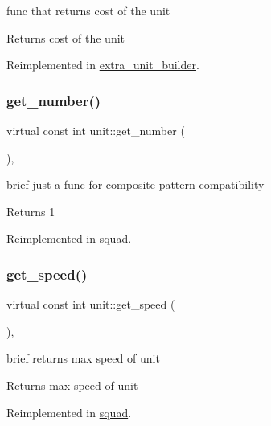 func that returns cost of the unit \begin{DoxyReturn}{Returns}
cost of the unit 
\end{DoxyReturn}


Reimplemented in \mbox{\hyperlink{classextra__unit__builder_a84ce334361c5acd1a59775a74fabde86}{extra\+\_\+unit\+\_\+builder}}.

\mbox{\label{classunit_ab417b46197e2490f7fe279a9219e0f3c}} 
\subsubsection{\texorpdfstring{get\+\_\+number()}{get\_number()}}
{\footnotesize\ttfamily virtual const int unit\+::get\+\_\+number (\begin{DoxyParamCaption}{ }\end{DoxyParamCaption})\hspace{0.3cm}{\ttfamily [inline]}, {\ttfamily [virtual]}}

brief just a func for composite pattern compatibility \begin{DoxyReturn}{Returns}
1 
\end{DoxyReturn}


Reimplemented in \mbox{\hyperlink{classsquad_a3b0a216e733b85a86721d4cef8c61f09}{squad}}.

\mbox{\label{classunit_af81d18961574843ddaa5273bfb57cf7f}} 
\subsubsection{\texorpdfstring{get\+\_\+speed()}{get\_speed()}}
{\footnotesize\ttfamily virtual const int unit\+::get\+\_\+speed (\begin{DoxyParamCaption}{ }\end{DoxyParamCaption})\hspace{0.3cm}{\ttfamily [inline]}, {\ttfamily [virtual]}}

brief returns max speed of unit \begin{DoxyReturn}{Returns}
max speed of unit 
\end{DoxyReturn}


Reimplemented in \mbox{\hyperlink{classsquad_a61378460e6a249acba2c201572449691}{squad}}.

